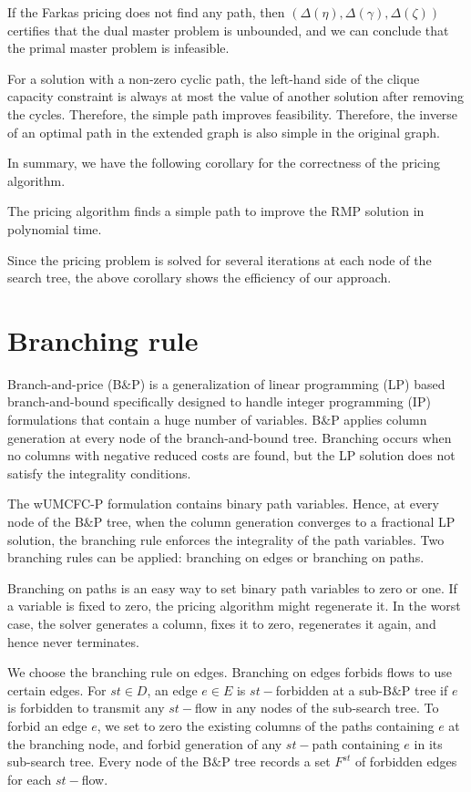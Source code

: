 If the Farkas pricing does not find any path, then \((\Delta(\eta), \Delta(\gamma), \Delta(\zeta))\) certifies that the dual master problem is unbounded, and we can conclude that the primal master problem is infeasible.

For a solution with a non-zero cyclic path, the left-hand side of the clique capacity constraint is always at most the value of another solution after removing the cycles. 
Therefore, the simple path improves feasibility. Therefore, the inverse of an optimal path in the extended graph is also simple in the original graph.

In summary, we have the following corollary for the correctness of the pricing algorithm.
\begin{corollary}
The pricing algorithm finds a simple path to improve the RMP solution in polynomial time.
\end{corollary}

Since the pricing problem is solved for several iterations at each node of the search tree, the above corollary shows the efficiency of our approach.

\section{Branching rule}
\label{sec.branch}
Branch-and-price (B\(\&\)P) is a generalization of linear programming (LP) based branch-and-bound specifically designed to handle integer programming (IP) formulations that contain a huge number of variables. B\(\&\)P applies column generation at every node of the branch-and-bound tree. 
Branching occurs when no columns with negative reduced costs are found, but the LP solution does not satisfy the integrality conditions.

The wUMCFC-P formulation contains binary path variables. Hence, at every node of the B\(\&\)P tree, when the column generation converges to a fractional LP solution, the branching rule enforces the integrality of the path variables. Two branching rules can be applied: branching on edges or branching on paths.

Branching on paths is an easy way to set binary path variables to zero or one. If a variable is fixed to zero, the pricing algorithm might regenerate it. In the worst case, the solver generates a column, fixes it to zero, regenerates it again, and hence never terminates. 

We choose the branching rule on edges.
Branching on edges \cite{barnhart2000using} forbids flows to use certain edges.
For $st \in D$, an edge \(e \in E\) is \(st-\)forbidden at a sub-B\(\&\)P tree if \(e\) is forbidden to transmit any \(st-\)flow in any nodes of the sub-search tree. To forbid an edge \(e\), we set to zero the existing columns of the paths containing \(e\) at the branching node, and forbid generation of any \(st-\)path containing \(e\) in its sub-search tree. Every node of the B\(\&\)P tree records a set \(F^{st}\) of forbidden edges for each \(st-\)flow.

